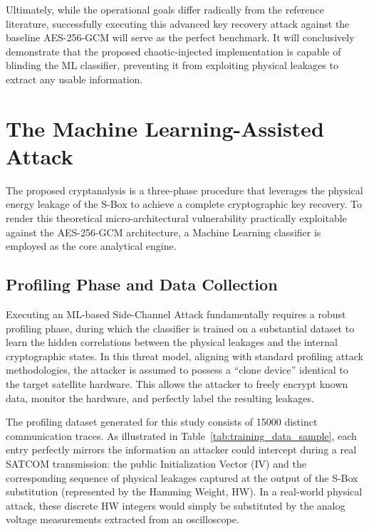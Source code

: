 \documentclass[11pt,a4paper]{report}
\begin{document}
Ultimately, while the operational goals differ radically from the reference literature, successfully executing this advanced key recovery attack against the baseline AES-256-GCM will serve as the perfect benchmark. 
It will conclusively demonstrate that the proposed chaotic-injected implementation is capable of blinding the ML classifier, preventing it from exploiting physical leakages to extract any usable information.

\section{The Machine Learning-Assisted Attack}
The proposed cryptanalysis is a three-phase procedure that leverages the physical energy leakage of the S-Box to achieve a complete cryptographic key recovery. 
To render this theoretical micro-architectural vulnerability practically exploitable against the AES-256-GCM architecture, a Machine Learning classifier is employed as the core analytical engine.

\subsection{Profiling Phase and Data Collection}
Executing an ML-based Side-Channel Attack fundamentally requires a robust profiling phase, during which the classifier is trained on a substantial dataset to learn the hidden correlations between the physical leakages and the internal cryptographic states. 
In this threat model, aligning with standard profiling attack methodologies, the attacker is assumed to possess a ``clone device'' identical to the target satellite hardware. 
This allows the attacker to freely encrypt known data, monitor the hardware, and perfectly label the resulting leakages.

The profiling dataset generated for this study consists of 15000 distinct communication traces. 
As illustrated in Table~\ref{tab:training_data_sample}, each entry perfectly mirrors the information an attacker could intercept during a real SATCOM transmission: 
the public Initialization Vector (IV) and the corresponding sequence of physical leakages captured at the output of the S-Box substitution (represented by the Hamming Weight, HW). 
In a real-world physical attack, these discrete HW integers would simply be substituted by the analog voltage measurements extracted from an oscilloscope.
\end{document}
